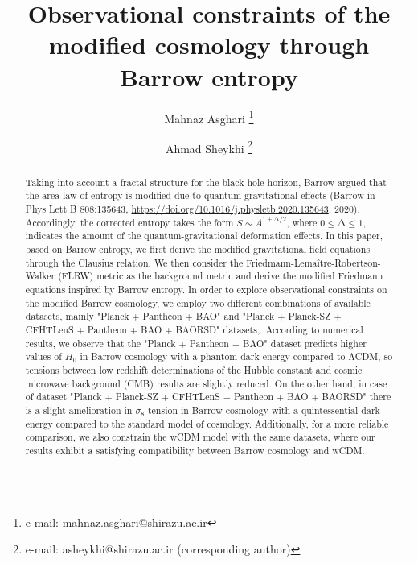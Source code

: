 \documentclass[11pt,twocolumn]{article}
\title{\textbf{\fontsize{14}{15}\selectfont Observational constraints of the modified cosmology through Barrow entropy}}
\author[1,2]{Mahnaz Asghari \thanks{e-mail: mahnaz.asghari@shirazu.ac.ir}}
\author[1,2]{Ahmad Sheykhi \thanks{e-mail: asheykhi@shirazu.ac.ir (corresponding author)}}
\affil[1]{\textit{\small Physics Department, College of Sciences, Shiraz University, Shiraz 71454, Iran}}
\affil[2]{\textit{\small Biruni Observatory, College of Sciences, Shiraz University, Shiraz 71454, Iran}}
\date{}
\begin{document}
\maketitle

\begin{abstract}
Taking into account a fractal structure for the black hole
horizon, Barrow argued that the area law of entropy is modified
due to quantum-gravitational effects (Barrow in Phys Lett B 808:135643, 
\url{https://doi.org/10.1016/j.physletb.2020.135643}, 2020). 
Accordingly, the corrected entropy takes the form $S \sim
A^{1+\mathrm{\Delta}/2}$, where $0\leq\mathrm{\Delta}\leq1$, indicates the amount of
the quantum-gravitational deformation effects. In this paper,
based on Barrow entropy, we first derive the modified
gravitational field equations through the Clausius relation. We
then consider the Friedmann-Lema\^itre-Robertson-Walker (FLRW) metric 
as the background metric and derive the modified Friedmann equations
inspired by Barrow entropy. In order to explore observational
constraints on the modified Barrow cosmology, we employ two
different combinations of available datasets, mainly "Planck + Pantheon
+ BAO" and "Planck + Planck-SZ + CFHTLenS + Pantheon + BAO + BAORSD"
datasets,. According to numerical results, we observe that the "Planck
+ Pantheon + BAO" dataset predicts higher values of $H_0$ in Barrow
cosmology with a phantom dark energy compared to $\mathrm{\Lambda}$CDM, so
tensions between low redshift determinations of the Hubble constant
and cosmic microwave background (CMB) results are slightly reduced.
On the other hand, in case of dataset "Planck + Planck-SZ +
CFHTLenS + Pantheon + BAO + BAORSD" there is a slight amelioration in
$\sigma_8$ tension in Barrow cosmology with a quintessential dark
energy compared to the standard model of cosmology. Additionally, 
for a more reliable comparison, we also constrain the wCDM model 
with the same datasets, where our results exhibit a satisfying 
compatibility between Barrow cosmology and wCDM.
\end{abstract}
\end{document}
